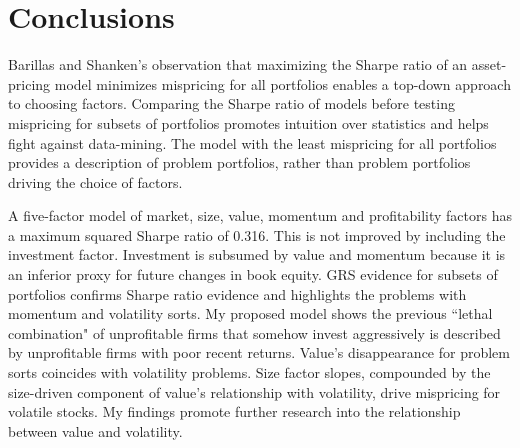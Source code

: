
\section*{Conclusions}

Barillas and Shanken’s observation that maximizing the Sharpe ratio of an
asset-pricing model minimizes mispricing for all portfolios enables a top-down
approach to choosing factors.
Comparing the Sharpe ratio of models before testing mispricing for subsets of
portfolios promotes intuition over statistics and helps fight against data-mining.
The model with the least mispricing for all portfolios provides a description
of problem portfolios, rather than problem portfolios driving the choice of factors.

A five-factor model of market, size, value, momentum and profitability factors
has a maximum squared Sharpe ratio of 0.316.
This is not improved by including the investment factor.
Investment is subsumed by value and momentum because it is an inferior proxy
for future changes in book equity.
GRS evidence for subsets of portfolios confirms Sharpe ratio evidence and
highlights the problems with momentum and volatility sorts.
My proposed model shows the previous ``lethal combination" of unprofitable
firms that somehow invest aggressively is described by unprofitable firms with
poor recent returns.
Value’s disappearance for problem sorts coincides with volatility problems.
Size factor slopes, compounded by the size-driven component of value's
relationship with volatility, drive mispricing for volatile stocks.
My findings promote further research into
the relationship between value and volatility.
